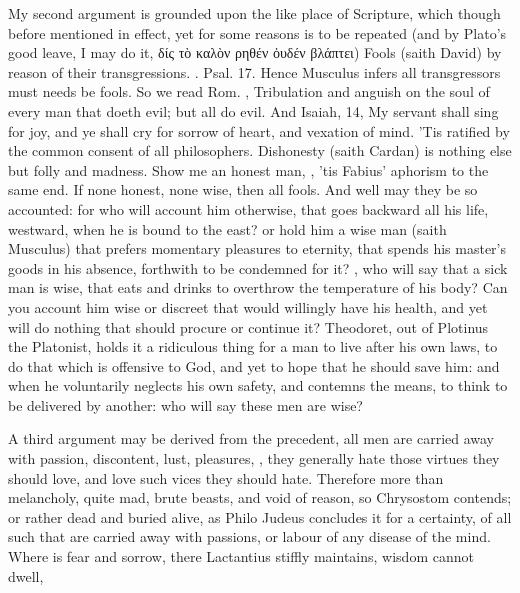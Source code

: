 {My second argument is grounded upon the like place of Scripture, which
though before mentioned in effect, yet for some reasons is to be
repeated (and by Plato's good leave, I may do it, \textgreek{δίς τὸ καλὸν
ρηθέν ὀυδέν βλάπτει}) Fools (saith David) by reason of their
transgressions. \etc{}. Psal.  17. Hence Musculus infers all
transgressors must needs be fools. So we read Rom. , Tribulation and
anguish on the soul of every man that doeth evil; but all do evil. And
Isaiah,  14, My servant shall sing for joy, and ye shall cry
for sorrow of heart, and vexation of mind. 'Tis ratified by the common
consent of all philosophers. Dishonesty (saith Cardan) is nothing else
but folly and madness.  Show me an
honest man, , 'tis Fabius' aphorism to the
same end. If none honest, none wise, then all fools. And well may they
be so accounted: for who will account him otherwise,  that goes backward all his
life, westward, when he is bound to the east? or hold him a wise man
(saith Musculus) that prefers momentary pleasures to eternity,
that spends his master's goods in his absence, forthwith to be
condemned for it? , who will say
that a sick man is wise, that eats and drinks to overthrow the
temperature of his body? Can you account him wise or discreet that
would willingly have his health, and yet will do nothing that should
procure or continue it? Theodoret, out of Plotinus the Platonist,
holds it a ridiculous thing for a man to live after his own laws, to do
that which is offensive to God, and yet to hope that he should save
him: and when he voluntarily neglects his own safety, and contemns the
means, to think to be delivered by another: who will say these men are
wise?

A third argument may be derived from the precedent, all men are
carried away with passion, discontent, lust, pleasures, \etc{}, they
generally hate those virtues they should love, and love such vices they
should hate. Therefore more than melancholy, quite mad, brute beasts,
and void of reason, so Chrysostom contends; or rather dead and buried
alive, as  Philo Judeus concludes it for a certainty, of all such
that are carried away with passions, or labour of any disease of the
mind. Where is fear and sorrow, there Lactantius stiffly
maintains, wisdom cannot dwell,

}

